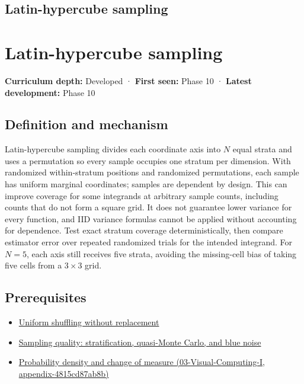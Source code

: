 \hypertarget{appendix-1c5e85693a06}{}
\section*{Latin-hypercube sampling}
\chapter{Latin-hypercube sampling}\label{appendix-1c5e85693a06-latin-hypercube-sampling}

\textbf{Curriculum depth:} Developed · \textbf{First seen:} Phase 10 · \textbf{Latest development:} Phase 10

\section{Definition and mechanism}\label{appendix-1c5e85693a06-definition-and-mechanism}

Latin-hypercube sampling divides each coordinate axis into \(N\) equal strata and uses a permutation so every sample occupies one stratum per dimension. With randomized within-stratum positions and randomized permutations, each sample has uniform marginal coordinates; samples are dependent by design. This can improve coverage for some integrands at arbitrary sample counts, including counts that do not form a square grid. It does not guarantee lower variance for every function, and IID variance formulas cannot be applied without accounting for dependence. Test exact stratum coverage deterministically, then compare estimator error over repeated randomized trials for the intended integrand. For \(N=5\), each axis still receives five strata, avoiding the missing-cell bias of taking five cells from a \(3\times3\) grid.

\section{Prerequisites}\label{appendix-1c5e85693a06-prerequisites}

\begin{itemize}
\tightlist
\item
  \hyperref[appendix-184fcc411663]{Uniform shuffling without replacement}
\item
  \hyperref[appendix-9f693ffd82bc]{Sampling quality: stratification, quasi-Monte Carlo, and blue noise}
\item
  \href{../03-Visual-Computing-I/main.pdf\#nameddest=appendix-4815cd87ab8b}{Probability density and change of measure (03-Visual-Computing-I, appendix-4815cd87ab8b)}
\end{itemize}

